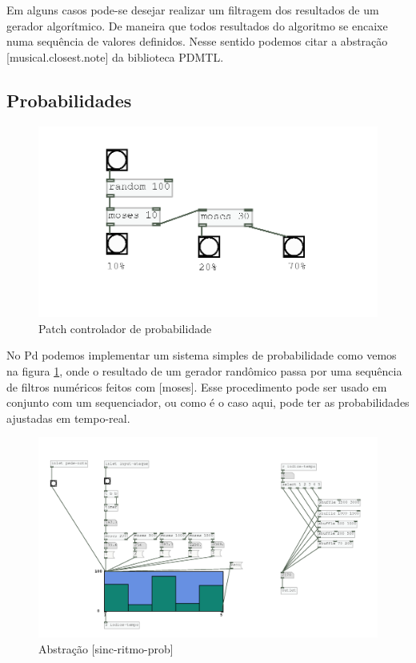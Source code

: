 \documentclass{ppgmus}
\begin{document}
Em alguns casos pode-se desejar realizar um filtragem
dos resultados de um gerador algorítmico. De maneira que
todos resultados do algoritmo se encaixe numa sequência
de valores definidos. Nesse sentido podemos citar a abstração
[musical.closest.note] da biblioteca PDMTL.




\subsection{Probabilidades}

\begin{figure}
\includegraphics[scale=.6]{probabilidade-simples}
\caption{Patch controlador de probabilidade}
\label{prob-simples}
\end{figure}  

No Pd podemos implementar um sistema simples de probabilidade como 
vemos na figura \ref{prob-simples}, onde o resultado de um gerador
randômico passa por uma sequência de filtros numéricos feitos
com [moses]. Esse procedimento pode ser usado em conjunto com um sequenciador,
ou como é o caso aqui, pode ter as probabilidades ajustadas em tempo-real.

\begin{figure}
\includegraphics[scale=.6]{sinc-ritmo-prob}
\caption{Abstração [sinc-ritmo-prob]}
\label{sinc-ritmo-prob}
\end{figure}
\end{document}
